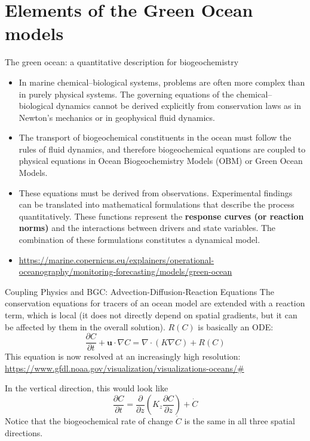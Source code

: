 \documentclass[english,aspectratio=169]{beamer}
\begin{document}
\section{Elements of the Green Ocean models}
\begin{frame}{The green ocean: a quantitative description for biogeochemistry}
\begin{itemize}
\item In marine chemical--biological systems, problems are often more complex than in purely physical systems. The governing equations of the chemical--biological dynamics cannot be derived explicitly from conservation laws as in Newton's mechanics or in geophysical fluid dynamics.
\item The transport of biogeochemical constituents in the ocean must follow the rules of fluid dynamics, and therefore biogeochemical equations are coupled to physical equations in Ocean Biogeochemistry Models (OBM) or Green Ocean Models.
\item These equations must be derived from observations. Experimental findings can be translated into mathematical formulations that describe the process quantitatively. These functions represent the \textbf{response curves (or reaction norms)} and the interactions between drivers and state variables. The combination of these formulations constitutes a dynamical model.
\item \url{https://marine.copernicus.eu/explainers/operational-oceanography/monitoring-forecasting/models/green-ocean}
\end{itemize}
\end{frame}

\begin{frame}{Coupling Physics and BGC: Advection-Diffusion-Reaction Equations}
The conservation equations for tracers of an ocean model are extended with a reaction term, which is local (it does not directly depend on spatial gradients, but it can be affected by them in the overall solution). $R(C)$ is basically an ODE:
\[
\frac{\partial C}{\partial t}
+ \mathbf{u} \cdot \nabla C
= \nabla \cdot (K \nabla C) + R(C)
\]
This equation is now resolved at an increasingly high resolution: \url{https://www.gfdl.noaa.gov/visualization/visualizations-oceans/#}

In the vertical direction, this would look like
\[
\frac{\partial C}{\partial t}
= \frac{\partial}{\partial z}
\left(K_z \frac{\partial C}{\partial z}\right) + \dot{C}
\]
Notice that the biogeochemical rate of change $\dot{C}$ is the same in all three spatial directions.
\end{frame}
\end{document}
